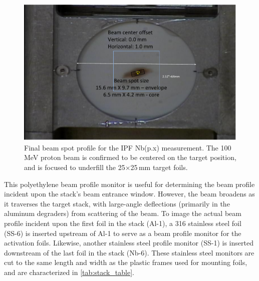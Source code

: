 \begin{figure}
 \centering
 \includegraphics[width=0.75\columnwidth]{./figures/ipf_preexp_beam_spot-cropped.pdf}
 \caption{Final beam spot profile for the IPF Nb(p.x) measurement. The 100\,MeV proton beam is confirmed to be centered on the target position, and is focused to underfill the 25$\times$25\,mm target foils.}
 \label{fig:fe_preexp_beam_spot}
\end{figure}





This polyethylene beam profile monitor is useful for determining the beam profile incident upon the stack's beam entrance window.
However, the beam broadens as it traverses the target stack, with large-angle deflections (primarily in the aluminum degraders) from scattering of the beam.
To image the actual beam profile incident upon the first foil in the stack (Al-1), a 316 stainless steel foil (SS-6) is inserted upstream of Al-1 to serve as a beam profile monitor for the activation foils.
Likewise, another stainless steel profile monitor (SS-1) is inserted downstream of the last foil in the stack (Nb-6).
These stainless steel monitors are cut to the same length and width as the plastic frames used for mounting foils, and are characterized in \autoref{tab:stack_table}.





